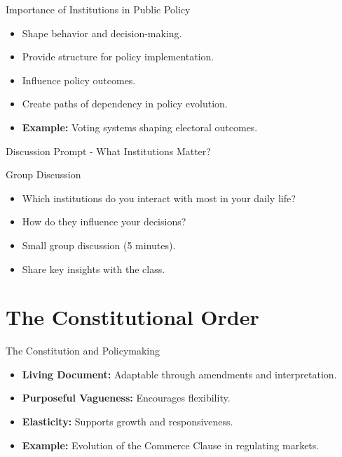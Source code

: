 \documentclass[12pt]{beamer}
\begin{document}
\begin{frame}{Importance of Institutions in Public Policy}
    \begin{itemize}
        \item Shape behavior and decision-making.
        \item Provide structure for policy implementation.
        \item Influence policy outcomes.
        \item Create paths of dependency in policy evolution.
        \item \textbf{Example:} Voting systems shaping electoral outcomes.
    \end{itemize}
\end{frame}

\begin{frame}{Discussion Prompt - What Institutions Matter?}
    \begin{block}{Group Discussion}
        \begin{itemize}
            \item Which institutions do you interact with most in your daily life?
            \item How do they influence your decisions?
        \end{itemize}
    \end{block}
    \begin{itemize}
        \item Small group discussion (5 minutes).
        \item Share key insights with the class.
    \end{itemize}
\end{frame}

\section{The Constitutional Order}
\begin{frame}{The Constitution and Policymaking}
    \begin{itemize}
        \item \textbf{Living Document:} Adaptable through amendments and interpretation.
        \item \textbf{Purposeful Vagueness:} Encourages flexibility.
        \item \textbf{Elasticity:} Supports growth and responsiveness.
        \item \textbf{Example:} Evolution of the Commerce Clause in regulating markets.
    \end{itemize}
\end{frame}
\end{document}

